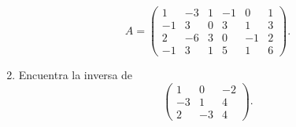 \documentclass[11pt,letterpaper]{article}
\begin{document}
\begin{enumerate}
\begin{equation*}
A=\left(\begin{array}{rrrrrr}
1  & -3 & 1 & -1 &  0 & 1\\
-1 &  3 & 0 &  3 &  1 & 3 \\
2  & -6 & 3 &  0 & -1 & 2\\
-1 &  3 & 1 &  5 &  1 & 6
\end{array}\right).
\end{equation*}

\item Encuentra la inversa de 
\begin{equation*}
\left(\begin{array}{rrr}
 1 &  0 & -2\\
-3 &  1 &  4\\
 2 & -3 &  4
\end{array}\right).
\end{equation*}


\end{enumerate}
\end{document}
